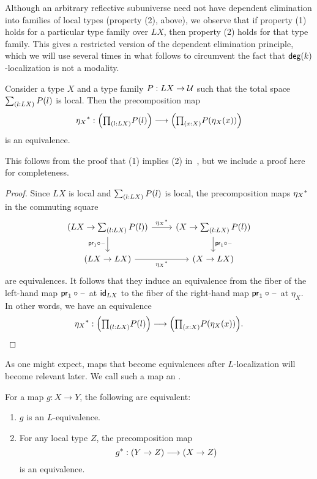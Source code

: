 Although an arbitrary reflective subuniverse need not have dependent elimination into
families of local types (property (2), above), we observe that if property (1) holds for a particular type family over $LX$,
then property (2) holds for that type family. This gives a restricted version of the dependent elimination principle,
which we will use several times in what follows to circumvent the fact that $\degg(k)$-localization is not a modality.

\begin{prop}\label{theorem:generalized-induction}
Consider a type $X$ and a type family $P:LX \to \UU$ such that the total space $\sm{l:LX} P(l)$ is local.
Then the precomposition map
\[
  \precomp{\eta_X} : \Big(\prd{l:LX}P(l)\Big) \lra \Big(\prd{x:X}P(\eta_X(x))\Big)
\]
is an equivalence.
\end{prop}

This follows from the proof that (1) implies (2) in~\cite[Theorem~1.32]{RijkeShulmanSpitters}, but we include
a proof here for completeness.

\begin{proof}
Since $LX$ is local and $\sm{l:LX}P(l)$ is local, the precomposition maps $\precomp{\eta_X}$ in the commuting square
\[
  \begin{tikzcd}
    (LX\to \sm{l:LX}P(l)) \arrow[r,"\precomp{\eta_X}"] \arrow[d,swap,"\proj 1\circ\blank"] & (X\to \sm{l:LX}P(l)) \arrow[d,"\proj 1\circ\blank"] \\
    (LX\to LX) \arrow[r,swap,"\precomp{\eta_X}"] & (X\to LX)
  \end{tikzcd}
\]
are equivalences. It follows that they induce an equivalence from the fiber of the left-hand map $\proj 1\circ\blank$ at $\idfunc[LX]$ to the fiber of the right-hand map $\proj 1\circ\blank$ at $\eta_X$. In other words, we have an equivalence
\[
  \precomp{\eta_X} : \Big(\prd{l:LX}P(l)\Big) \lra \Big(\prd{x:X}P(\eta_X(x))\Big).\qedhere
\]
\end{proof}

\medskip
As one might expect, maps that become equivalences after $L$-localization
will become relevant later.
We call such a map an .

\begin{lem}\label{lemma:characterizationorthogonal}
For a map $g : X \to Y$, the following are equivalent:
\begin{enumerate}
\item $g$ is an $L$-equivalence.
\item For any local type $Z$, the precomposition map
\[
  \precomp{g} : (Y \to Z) \lra (X \to Z)
\]
is an equivalence.
\end{enumerate}
\end{lem}

